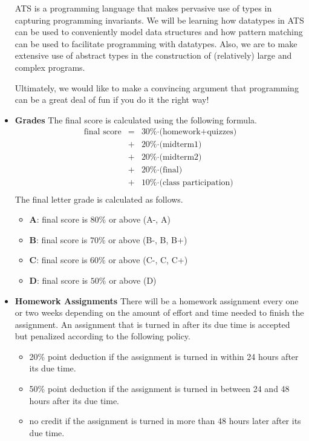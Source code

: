 \documentclass[11pt]{article}
\begin{document}
\begin{itemize}
ATS is a programming language that makes pervasive use of types in
capturing programming invariants. We will be learning how datatypes in ATS
can be used to conveniently model data structures and how pattern matching
can be used to facilitate programming with datatypes. Also, we are to make
extensive use of abstract types in the construction of (relatively) large
and complex programs.

Ultimately, we would like to make a convincing argument that programming
can be a great deal of fun if you do it the right way!

\item {\bf Grades}
The final score is calculated using the following formula.
\[\begin{array}{rcl}
\mbox{final score} & = & \mbox{30\%$\cdot$(homework+quizzes)} \\
                   & + & \mbox{20\%$\cdot$(midterm1)} \\
                   & + & \mbox{20\%$\cdot$(midterm2)} \\
                   & + & \mbox{20\%$\cdot$(final)} \\
                   & + & \mbox{10\%$\cdot$(class participation)} \\
\end{array}\]
The final letter grade is calculated as follows.
\begin{itemize}
\item{\bf A}: final score is $80\%$ or above (A-, A)
\item{\bf B}: final score is $70\%$ or above (B-, B, B+)
\item{\bf C}: final score is $60\%$ or above (C-, C, C+)
\item{\bf D}: final score is $50\%$ or above (D)
\end{itemize}

\item{\bf Homework Assignments}
There will be a homework assignment every one or two weeks depending on the
amount of effort and time needed to finish the assignment. An assignment that
is turned in after its due time is accepted but penalized according to the
following policy.
\begin{itemize}
\item 20\% point deduction if the assignment is turned in within 24 hours
after its due time.
\item 50\% point deduction if the assignment is turned in between 24 and 48 hours
after its due time.
\item no credit if the assignment is turned in more than 48 hours later after its due time.
\end{itemize}


\end{itemize}
\end{document}
